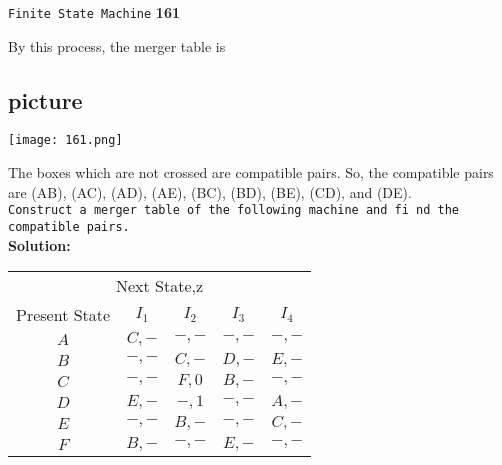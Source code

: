 \documentclass[10pt]{article}
\begin{document}
\begin{flushright}
 \texttt{Finite State Machine} \hspace*{1cm} \textbf{161}
\end{flushright}

\vspace*{0.5cm}
By this process, the merger table is\\

\vspace*{0.1cm}
\begin{center}
\section{picture}
\texttt{[image: 161.png]}
\end{center}

\vspace*{0.1cm}
\hspace*{0.5cm} The boxes which are not crossed are compatible pairs. So, the compatible pairs are (AB), (AC),
(AD), (AE), (BC), (BD), (BE), (CD), and (DE).\\

\hspace*{0.1cm} \texttt{\small{Construct a merger table of the following machine and fi nd the compatible pairs.}} \\

\vspace*{0.1cm}
\textbf{Solution:}\\

\vspace*{0.1cm}
\begin{center}
\begin{tabular}{ccccc}
\hline

\hline

\hline

\hline
  \multicolumn{5}{c}{{Next State,z}}\\
 \cline{2-5}
{Present State} & {$I_1$} & {$I_2$} & {$I_3$} & {$I_4$}\\
\hline
$A$ & $C, -$ & $-, -$ &  $-, -$   &  $-, -$\\
$B$ & $-, -$ & $C, -$ &  $D, -$   &  $E, -$\\
$C$ & $-, -$ & $F, 0$ &  $B, -$   &  $-, -$\\
$D$ & $E, -$ & $-, 1$ &  $-, -$   &  $A, -$\\
$E$ & $-, -$ & $B, -$ &  $-, -$   &  $C, -$\\
$F$ & $B, -$ & $-, -$ &  $E, -$   &  $-, -$\\
\hline

\hline

\hline

\hline
\end{tabular}
\end{center}
\end{document}
